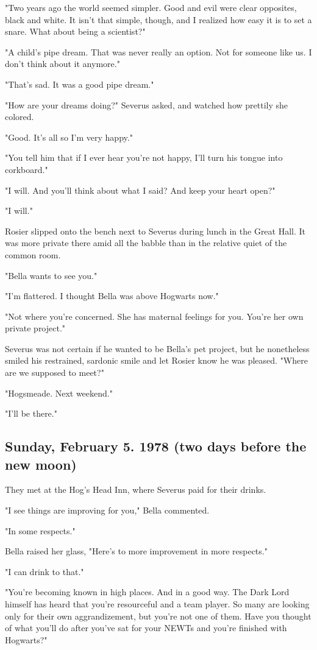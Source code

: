 "Two years ago the world seemed simpler. Good and evil were clear opposites, black and white. It isn't that simple, though, and I realized how easy it is to set a snare. What about being a scientist?"

"A child's pipe dream. That was never really an option. Not for someone like us. I don't think about it anymore."

"That's sad. It was a good pipe dream."

"How are your dreams doing?" Severus asked, and watched how prettily she colored.

"Good. It's all so{\el} I'm very happy."

"You tell him that if I ever hear you're not happy, I'll turn his tongue into corkboard."

"I will. And you'll think about what I said? And keep your heart open?"

"I will."

Rosier slipped onto the bench next to Severus during lunch in the Great Hall. It was more private there amid all the babble than in the relative quiet of the common room.

"Bella wants to see you."

"I'm flattered. I thought Bella was above Hogwarts now."

"Not where you're concerned. She has maternal feelings for you. You're her own private project."

Severus was not certain if he wanted to be Bella's pet project, but he nonetheless smiled his restrained, sardonic smile and let Rosier know he was pleased. "Where are we supposed to meet?"

"Hogsmeade. Next weekend."

"I'll be there."

\subsection{Sunday, February 5. 1978 (two days before the new moon)}

They met at the Hog's Head Inn, where Severus paid for their drinks.

"I see things are improving for you," Bella commented.

"In some respects."

Bella raised her glass, "Here's to more improvement in more respects."

"I can drink to that."

"You're becoming known in high places. And in a good way. The Dark Lord himself has heard that you're resourceful and a team player. So many are looking only for their own aggrandizement, but you're not one of them. Have you thought of what you'll do after you've sat for your NEWTs and you're finished with Hogwarts?"


